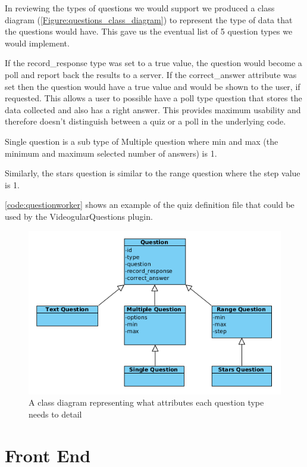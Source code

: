 In reviewing the types of questions we would support we produced a class diagram (\autoref{Figure:questions_class_diagram}) to represent the type of data that the questions would have. This gave us the eventual list of 5 question types we would implement.

If the record\_response type was set to a true value, the question would become a poll and report back the results to a server. If the correct\_answer attribute was set then the question would have a true value and would be shown to the user, if requested. This allows a user to possible have a poll type question that stores the data collected and also has a right answer. This provides maximum usability and therefore doesn't distinguish between a quiz or a poll in the underlying code.

Single question is a sub type of Multiple question where min and max (the minimum and maximum selected number of answers) is 1.

Similarly, the stars question is similar to the range question where the step value is 1.

\autoref{code:questionworker} shows an example of the quiz definition file that could be used by the VideogularQuestions plugin.


\begin{figure}
\centering
\includegraphics[width=12cm]{../figures/questions_class_diagram.png}
\caption{A class diagram representing what attributes each question type needs to detail}
\label{Figure:questions_class_diagram}
\end{figure}

\section{Front End}
\label{Section:Front end}

